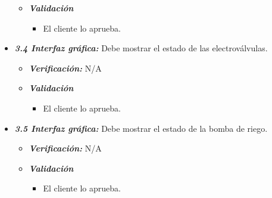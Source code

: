 \documentclass[11pt]{charter}
\begin{document}
\begin{itemize}
\begin{itemize}
		\item \textit{\textbf{Validación}}
		\begin{itemize}
			\item El cliente lo aprueba.
		\end{itemize}
	\end{itemize}
	
	\item \textit{\textbf{3.4 Interfaz gráfica:}} Debe mostrar el estado de las electroválvulas.
	\begin{itemize}
		\item \textit{ \textbf{Verificación:}} N/A
		
		\item \textit{\textbf{Validación}}
		\begin{itemize}
			\item El cliente lo aprueba.
		\end{itemize}
	\end{itemize}
	
	\item \textit{\textbf{3.5 Interfaz gráfica:}} Debe mostrar el estado de la bomba de riego.
	\begin{itemize}
		\item \textit{ \textbf{Verificación:}} N/A
		
		\item \textit{\textbf{Validación}}
		\begin{itemize}
			\item El cliente lo aprueba.
		\end{itemize}
	\end{itemize}
	
\end{itemize}					
	
	
	




\end{document}
